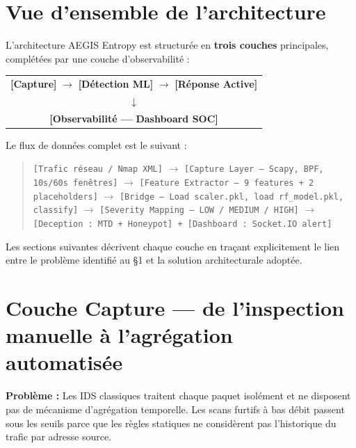 \documentclass[12pt,a4paper]{article}
\newcommand{\problem}{\textcolor{accentred}{\textbf{Probl\`{e}me : }}}
\begin{document}
\section{Vue d'ensemble de l'architecture}

L'architecture AEGIS Entropy est structur\'{e}e en \textbf{trois couches}
principales, compl\'{e}t\'{e}es par une couche d'observabilit\'{e} :

\begin{center}
\small
\begin{tabular}{c}
\textbf{[Capture]} $\longrightarrow$
\textbf{[D\'{e}tection ML]} $\longrightarrow$
\textbf{[R\'{e}ponse Active]} \\
\hspace{3cm} $\downarrow$ \\
\hspace{3cm} \textbf{[Observabilit\'{e} --- Dashboard SOC]}
\end{tabular}
\end{center}

\vspace{0.5em}
\noindent Le flux de donn\'{e}es complet est le suivant :

\begin{quote}
\small
\texttt{[Trafic r\'{e}seau / Nmap XML]}
$\rightarrow$
\texttt{[Capture Layer --- Scapy, BPF, 10s/60s fen\^{e}tres]}
$\rightarrow$
\texttt{[Feature Extractor --- 9 features + 2 placeholders]}
$\rightarrow$
\texttt{[Bridge --- Load scaler.pkl, load rf\_model.pkl, classify]}
$\rightarrow$
\texttt{[Severity Mapping --- LOW / MEDIUM / HIGH]}
$\rightarrow$
\texttt{[Deception : MTD + Honeypot] + [Dashboard : Socket.IO alert]}
\end{quote}

Les sections suivantes d\'{e}crivent chaque couche en tra\c{c}ant explicitement
le lien entre le probl\`{e}me identifi\'{e} au \S1 et la solution architecturale
adopt\'{e}e.

\section{Couche Capture --- de l'inspection manuelle \`{a} l'agr\'{e}gation automatis\'{e}e}

\problem Les IDS classiques traitent chaque paquet isol\'{e}ment et ne
disposent pas de m\'{e}canisme d'agr\'{e}gation temporelle. Les scans furtifs
\`{a} bas d\'{e}bit passent sous les seuils parce que les r\`{e}gles statiques
ne consid\`{e}rent pas l'historique du trafic par adresse source.
\end{document}

